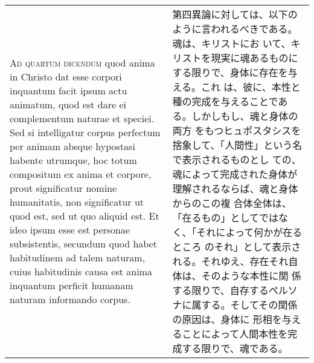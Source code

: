 \documentclass[10pt]{jsarticle} %
\begin{document}
\begin{longtable}{p{21em}p{21em}}
\\



{\scshape Ad quartum dicendum} quod anima in Christo dat esse corpori
inquantum facit ipsum actu animatum, quod est dare ei complementum
naturae et speciei. Sed si intelligatur corpus perfectum per animam
absque hypostasi habente utrumque, hoc totum compositum ex anima et
corpore, prout significatur nomine humanitatis, non significatur ut
quod est, sed ut quo aliquid est. Et ideo ipsum esse est personae
subsistentis, secundum quod habet habitudinem ad talem naturam, cuius
habitudinis causa est anima inquantum perficit humanam naturam
informando corpus.


&

第四異論に対しては、以下のように言われるべきである。魂は、キリストにお
いて、キリストを現実に魂あるものにする限りで、身体に存在を与える。これ
は、彼に、本性と種の完成を与えることである。しかしもし、魂と身体の両方
をもつヒュポスタシスを捨象して、「人間性」という名で表示されるものとし
ての、魂によって完成された身体が理解されるならば、魂と身体からのこの複
合体全体は、「在るもの」としてではなく、「それによって何かが在るところ
のそれ」として表示される。それゆえ、存在それ自体は、そのような本性に関
係する限りで、自存するペルソナに属する。そしてその関係の原因は、身体に
形相を与えることによって人間本性を完成する限りで、魂である。



\end{longtable}
\end{document}
